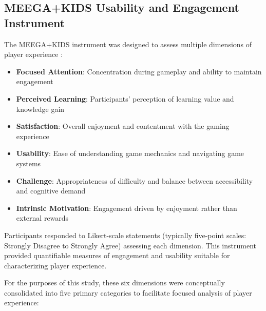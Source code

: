 \subsection{MEEGA+KIDS Usability and Engagement Instrument}

The MEEGA+KIDS instrument was designed to assess multiple dimensions of player experience \cite{vonWangenheim2020}:

\begin{itemize}
    \item \textbf{Focused Attention}: Concentration during gameplay and ability to maintain engagement
    \item \textbf{Perceived Learning}: Participants' perception of learning value and knowledge gain
    \item \textbf{Satisfaction}: Overall enjoyment and contentment with the gaming experience
    \item \textbf{Usability}: Ease of understanding game mechanics and navigating game systems
    \item \textbf{Challenge}: Appropriateness of difficulty and balance between accessibility and cognitive demand
    \item \textbf{Intrinsic Motivation}: Engagement driven by enjoyment rather than external rewards
\end{itemize}

Participants responded to Likert-scale statements (typically five-point scales: Strongly Disagree to Strongly Agree) assessing each dimension. This instrument provided quantifiable measures of engagement and usability suitable for characterizing player experience.

For the purposes of this study, these six dimensions were conceptually consolidated into five primary categories to facilitate focused analysis of player experience:

